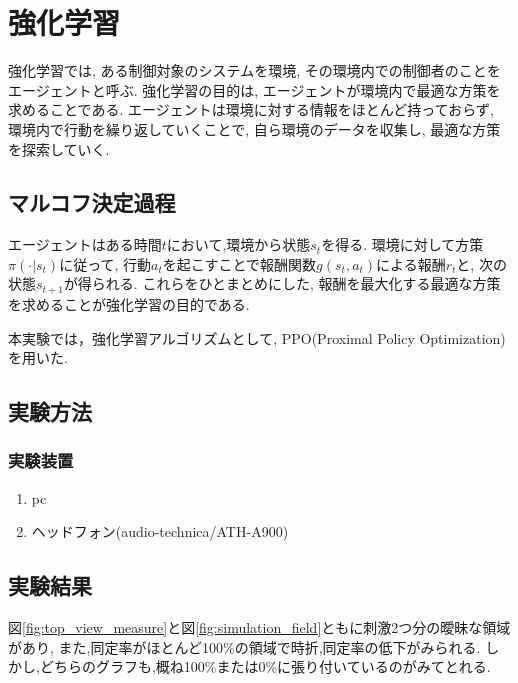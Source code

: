 \documentclass[../main]{subfiles}
\begin{document}
\newpage
\chapter{強化学習}
\label{chap:RL}

強化学習では, ある制御対象のシステムを環境,
その環境内での制御者のことをエージェントと呼ぶ.
強化学習の目的は, エージェントが環境内で最適な方策を求めることである.
エージェントは環境に対する情報をほとんど持っておらず,
環境内で行動を繰り返していくことで,
自ら環境のデータを収集し, 最適な方策を探索していく.

\section{マルコフ決定過程}
エージェントはある時間$t$において,環境から状態$s_t$を得る.
環境に対して方策$\pi(\cdot|s_t)$に従って,
行動$a_t$を起こすことで報酬関数$g(s_t,a_t)$による報酬$r_t$と, 
次の状態$s_{t+1}$が得られる. これらをひとまとめにした,
報酬を最大化する最適な方策を求めることが強化学習の目的である.


本実験では，強化学習アルゴリズムとして,
PPO(Proximal Policy Optimization)\cite{ref:proximal_policy}を用いた.


\section{実験方法}
  \subsection{実験装置}
  \begin{enumerate}
    \item pc
    \item ヘッドフォン(audio-technica/ATH-A900)
  \end{enumerate}

\newpage
\section{実験結果}
  図\ref{fig:top_view_measure}と図\ref{fig:simulation_field}ともに刺激2つ分の曖昧な領域があり,
  また,同定率がほとんど100\%の領域で時折,同定率の低下がみられる.
  しかし,どちらのグラフも,概ね100\%または0\%に張り付いているのがみてとれる.
\end{document}
